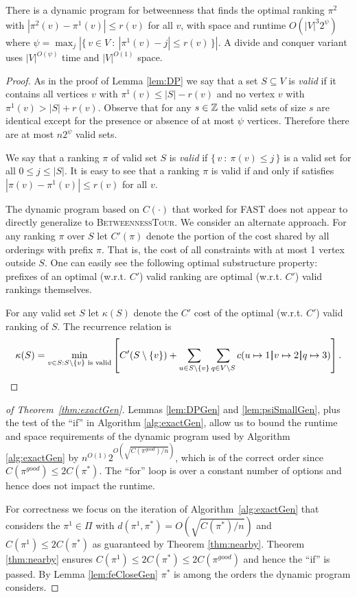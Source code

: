 \documentclass[envcountsame,oribibl]{llncs}
\newcommand{\set}[1]{\{#1\}}                        \newcommand{\setof}[2]{\{\,{#1}\::\:{#2}\,\}}        \newcommand{\groupFrac}[2]{\left(\frac{#1}{#2}\right)}
\newcommand{\sm}{\setminus} \newcommand{\compl}[1]{\overline{#1}}                \newcommand{\floor}[1]{\left\lfloor #1 \right\rfloor}
\newcommand{\bp}{\,\rule[-0.22em]{0.08em}{1em}\,}
\newcommand{\betTour}{\textsc{BetweennessTour}}
\newcommand{\fast}{\textsc{FAST}}
\begin{document}
\begin{lemma}\label{lem:DPGen}
There is a dynamic program for betweenness that finds the optimal ranking $\pi^2$ with $|\pi^2(v) - \pi^1(v)| \le r(v)$ for all $v$, with space and runtime $O(|V|^3 2^{\psi})$ where $\psi = \max_j |\setof{v \in V}{|\pi^1(v) - j| \le r(v)}|$. A divide and conquer variant uses $|V|^{O(\psi)}$ time and $|V|^{O(1)}$ space.
\end{lemma}

\begin{proof}
As in the proof of Lemma \ref{lem:DP} we say that a set $S \subseteq V$ is \emph{valid} if it contains all vertices $v$ with $\pi^1(v) \le |S| - r(v)$ and no vertex $v$ with $\pi^1(v) > |S| + r(v)$. Observe that for any $s \in \mathbb{Z}$ the valid sets of size $s$ are identical except for the presence or absence of at most $\psi$ vertices. Therefore there are at most $n 2^\psi$ valid sets. 

We say that a ranking $\pi$ of valid set $S$ is \emph{valid} if $\setof{v}{\pi(v) \le j}$ is a valid set for all $0 \le j \le |S|$. It is easy to see that a ranking $\pi$ is valid if and only if satisfies $|\pi(v) - \pi^1(v)| \le r(v)$ for all $v$.

The dynamic program based on $C(\cdot)$ that worked for \fast{} does not appear to directly generalize to \betTour. We consider an alternate approach.
For any ranking $\pi$ over $S$ let $C'(\pi)$ denote the portion of the cost shared by all orderings with prefix $\pi$. That is, the cost of all constraints with at most 1 vertex outside $S$. One can easily see the following optimal substructure property: prefixes of an optimal (w.r.t. $C'$) valid ranking are optimal (w.r.t. $C'$) valid rankings themselves.

For any valid set $S$ let $\kappa(S)$ denote the $C'$ cost of the optimal (w.r.t. $C'$) valid ranking of $S$. The recurrence relation is
\[
\kappa(S) = \min_{v \in S : S \sm \set{v} \text{ is valid}} \left[ C'(S \sm \set{v}) + \sum_{u \in S \sm \set{v}}\sum_{q \in V \sm S} c(u \mapsto 1 \bp v \mapsto 2 \bp q \mapsto 3) \right]
.\]
\end{proof}

\begin{proof}[of Theorem~\ref{thm:exactGen}]
Lemmas \ref{lem:DPGen} and \ref{lem:psiSmallGen}, plus the test of the ``if'' in Algorithm  \ref{alg:exactGen}, allow us to bound the runtime and space requirements of the dynamic program used by Algorithm \ref{alg:exactGen} by $n^{O(1)} 2^{O(\sqrt{C(\pi^{good})/n})}$, which is of the correct order since $C(\pi^{good}) \le 2 C(\pi^*)$. The ``for'' loop is over a constant number of options and hence does not impact the runtime.

For correctness we focus on the iteration of Algorithm~\ref{alg:exactGen} that considers the $\pi^1 \in \Pi$ with $d(\pi^1, \pi^*) = O(\sqrt{C(\pi^*) / n})$ and $C(\pi^1) \le 2 C(\pi^*)$ as guaranteed by Theorem \ref{thm:nearby}. Theorem \ref{thm:nearby} ensures $C(\pi^1) \le 2 C(\pi^*) \le 2 C(\pi^{good})$ and hence the ``if'' is passed. By Lemma \ref{lem:feCloseGen} $\pi^*$ is among the orders the dynamic program considers.
\end{proof}
\end{document}
